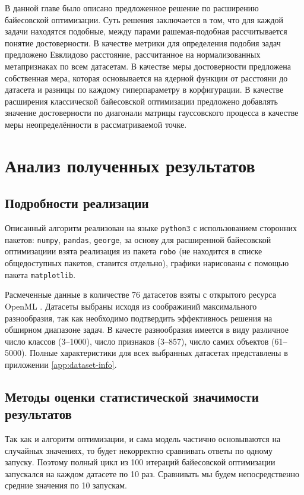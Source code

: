 \documentclass[times,specification,annotation]{itmo-student-thesis}
\begin{document}
	
	\chapterconclusion
	В данной главе было описано предложенное решение по расширению байесовской оптимизации. Суть решения заключается в том, что для каждой задачи находятся подобные, между парами рашемая-подобная рассчитывается понятие достоверности. В качестве метрики для определения подобия задач предложено Евклидово расстояние, рассчитанное на нормализованных метапризнаках по всем датасетам. В качестве меры достоверности предложена собственная мера, которая основывается на ядерной функции от расстояни до датасета и разницы по каждому гиперпараметру в корфигурации. В качестве расширения классической байесовской оптимизации предложено добавлять значение достоверности по диагонали матрицы гауссовского процесса в качестве меры неопределённости в рассматриваемой точке.
	
	\chapter{Анализ полученных результатов}
	\section{Подробности реализации}
	Описанный алгоритм реализован на языке \texttt{python3} с использованием сторонних пакетов: \texttt{numpy}, \texttt{pandas}, \texttt{george}, за основу для расширенной байесовской оптимизациии взята реализация из пакета \texttt{robo} (не находится в списке общедоступных пакетов, ставится отдельно), графики нарисованы с помощью пакета \texttt{matplotlib}. \par 
	
	Расмеченные данные в количестве 76 датасетов взяты с открытого ресурса OpenML \cite{OpenML2013}. Датасеты выбраны исходя из соображиний максимального разнообразия, так как необходимо подтвердить эффективнось решения на обширном диапазоне задач. В качесте разнообразия имеется в виду различное число классов (3--1000), число признаков (3--857), число самих объектов (61--5000). Полные характеристики для всех выбранных датасетах представлены в приложении \ref{app:dataset-info}. 
	
	\section{Методы оценки статистической значимости результатов} \label{s:cox}
	Так как и алгоритм оптимизации, и сама модель частично основываются на случайных значениях, то будет некорректно сравнивать ответы по одному запуску. Поэтому полный цикл из 100 итераций байесовской оптимизации запускался на каждом датасете по 10 раз. Сравнивать мы будем непосредственно средние значения по 10 запускам. \par 
	
\end{document}
